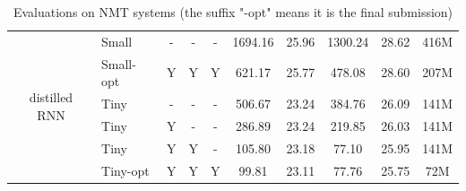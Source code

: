 \documentclass[11pt,a4paper]{article}
\begin{document}
\begin{table}[]
\begin{tabular}{clcccccccc}
\multirow{6}{*}{distilled RNN}   & Small     & -                                                                           & -                     & -                                                                         & 1694.16              & 25.96     & 1300.24              & 28.62     & 416M                        \\
                             & Small-opt & Y                                                                           & Y                     & Y                                                                         & 621.17               & 25.77     & 478.08               & 28.60     & 207M                        \\
                             & Tiny      & -                                                                           & -                     & -                                                                         & 506.67               & 23.24     & 384.76               & 26.09     & 141M                        \\
                             & Tiny      & Y                                                                           & -                     & -                                                                         & 286.89               & 23.24     & 219.85               & 26.03     & 141M                        \\
                             & Tiny      & Y                                                                           & Y                     & -                                                                         & 105.80               & 23.18     & 77.10                & 25.95     & 141M                        \\
                             & Tiny-opt  & Y                                                                           & Y                     & Y                                                                         & 99.81                & 23.11     & 77.76                & 25.75     & 72M                         \\ \hline
\end{tabular}
\caption{\small Evaluations on NMT systems (the suffix "-opt" means it is the final submission)}
\label{table:score}
\end{table}
\end{document}
